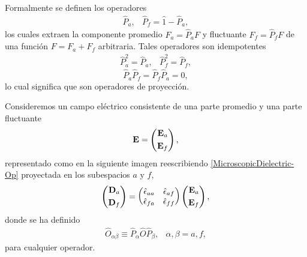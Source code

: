 \documentclass[12pt]{article}
\begin{document}
Formalmente se definen los operadores 
\begin{equation}
  \begin{array}{cc}
    \label{operadoresPromedio-Fluctuaciones}
    \hat{P}_{a}, & \hat{P}_{f} = \hat{1} - \hat{P}_{a}, 
  \end{array}
\end{equation}
los cuales extraen la componente promedio $F_{a}=\hat{P}_{a}F$ y
fluctuante $F_{f}=\hat{P}_{f}F$ de una función $F = F_{a}+F_{f}$
arbitraria. Tales operadores son idempotentes
\begin{equation}
  \begin{array}{cc}
    \label{Op-Idempotentes}
    \hat{P}^{2}_{a}=\hat{P}_{a}, & \hat{P}^{2}_{f} =\hat{P}_{f},
  \end{array}
\end{equation}
\begin{equation}
  \hat{P}_{a}\hat{P}_{f}=\hat{P}_{f}\hat{P}_{a}=0,
\end{equation}
lo cual significa que son operadores de proyección.

Consideremos un campo eléctrico consistente de una parte promedio y
una parte fluctuante
\begin{equation}
  {\bf E} = \left(\begin{split} {\bf E}_{a} \\
    {\bf E}_{f} \end{split}\right),
\end{equation}
representado como en la siguiente imagen reescribiendo
\eqref{MicroscopicDielectric-Op} proyectada en los subespacios $a$ y
$f$,
\begin{equation}
  \label{CamposCompletos}
  \left(\begin{split} {\bf D}_{a} \\  {\bf D}_{f} \end{split}\right) =
  \left(\begin{matrix} \hat{\epsilon}_{aa} & \hat{\epsilon}_{af} \\
    \hat{\epsilon}_{fa} & \hat{\epsilon}_{ff} \end{matrix}\right)
  \left(\begin{split} {\bf E}_{a} \\ {\bf E}_{f} \end{split}\right),
\end{equation}
donde se ha definido
\begin{equation}
  \begin{array}{cc}
    \hat{O}_{\alpha \beta}\equiv \hat{P}_{\alpha}\hat{O}\hat{P}_{\beta}, & \alpha,\beta =a,f,
  \end{array}
\end{equation}
para cualquier operador.
\end{document}
